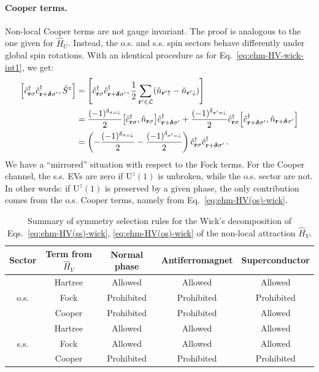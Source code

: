 \paragraph{Cooper terms.} Non-local Cooper terms are not gauge invariant. The proof is analogous to the one given for $\hat H_U$. Instead, the o.s. and s.s. spin sectors behave differently under global spin rotations. With an identical procedure as for Eq.~\eqref{eq:ehm-HV-wick-int1}, we get:
\begin{align}
	\comm{\hat c_{\mathbf{r}\sigma}^\dagger \hat c_{\mathbf{r}+\bm{\delta}\sigma'}^\dagger}{\hat S^z} &= \comm{\hat c_{\mathbf{r}\sigma}^\dagger \hat c_{\mathbf{r}+\bm{\delta}\sigma'}^\dagger}{\frac{1}{2} \sum_{\mathbf{r}'\in\mathcal{L}} (\hat n_{\mathbf{r}'\uparrow}-\hat n_{\mathbf{r}'\downarrow}) } \nonumber \\
	&= \frac{(-1)^{\delta_{\sigma=\downarrow}}}{2} \comm{\hat c_{\mathbf{r}\sigma}^\dagger}{\hat n_{\mathbf{r}\sigma}} \hat c_{\mathbf{r}+\bm{\delta}\sigma'}^\dagger + \frac{(-1)^{\delta_{\sigma'=\downarrow}}}{2} \hat c_{\mathbf{r}\sigma}^\dagger \comm{\hat c_{\mathbf{r}+\bm{\delta}\sigma'}^\dagger}{\hat n_{\mathbf{r}+\bm{\delta}\sigma'}} \nonumber \\
	&= \left(
	-\frac{(-1)^{\delta_{\sigma=\downarrow}}}{2} - \frac{(-1)^{\delta_{\sigma'=\downarrow}}}{2}
	\right)\hat c_{\mathbf{r}\sigma}^\dagger \hat c_{\mathbf{r}+\bm{\delta}\sigma'}^\dagger \, . \label{eq:ehm-HV-wick-int2}
\end{align}
We have a ``mirrored'' situation with respect to the Fock terms. For the Cooper channel, the s.s. EVs are zero if $\mathrm{U}^z(1)$ is unbroken, while the o.s. sector are not. In other words: if $\mathrm{U}^z(1)$ is preserved by a given phase, the only contribution comes from the o.s. Cooper terms, namely from Eq.~\eqref{eq:ehm-HV(os)-wick}.

\begin{table}
	\centering
	\begin{tabular}{c c c c c}
		\textbf{Sector}& \textbf{Term from $\hat H_V$} & \textbf{Normal phase} & \textbf{Antiferromagnet} & \textbf{Superconductor} \\
		\midrule
		& Hartree & Allowed & Allowed & Allowed \\
		o.s. & Fock & Prohibited & Prohibited & Prohibited \\
		& Cooper & Prohibited & Prohibited & Allowed \\
		\midrule
		& Hartree & Allowed & Allowed & Allowed \\
		s.s. & Fock & Allowed & Allowed & Allowed \\
		& Cooper & Prohibited & Prohibited & Prohibited \\
		\midrule
	\end{tabular}
	\caption{Summary of symmetry selection rules for the Wick's decomposition of Eqs.~\eqref{eq:ehm-HV(ss)-wick}, \eqref{eq:ehm-HV(os)-wick} of the non-local attraction $\hat H_V$.}
	\label{tab:HV-sel-rules}
\end{table}

